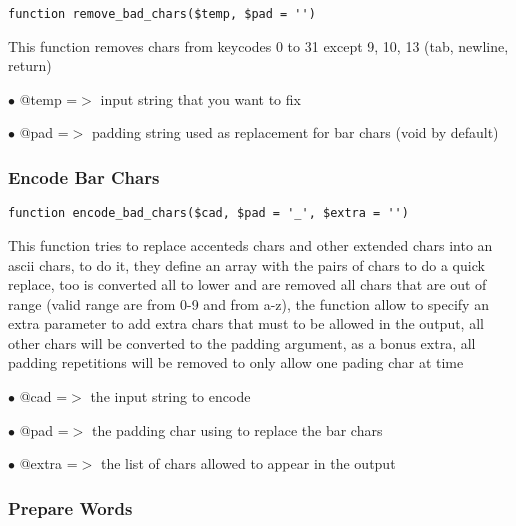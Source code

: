 \documentclass[a4paper]{article}
\begin{document}
\begin{lstlisting}
function remove_bad_chars($temp, $pad = '')
\end{lstlisting}

This function removes chars from keycodes 0 to 31 except 9, 10, 13 (tab,
newline, return)

\begin{compactitem}
\item[\color{myblue}$\bullet$] @temp =$>$ input string that you want to fix
\item[\color{myblue}$\bullet$] @pad  =$>$ padding string used as replacement for bar chars (void by default)
\end{compactitem}

\hypertarget{toc238}{}
\subsubsection{Encode Bar Chars}

\begin{lstlisting}
function encode_bad_chars($cad, $pad = '_', $extra = '')
\end{lstlisting}

This function tries to replace accenteds chars and other extended chars into
an ascii chars, to do it, they define an array with the pairs of chars to
do a quick replace, too is converted all to lower and are removed all chars
that are out of range (valid range are from 0-9 and from a-z), the function
allow to specify an extra parameter to add extra chars that must to be
allowed in the output, all other chars will be converted to the padding
argument, as a bonus extra, all padding repetitions will be removed to
only allow one pading char at time

\begin{compactitem}
\item[\color{myblue}$\bullet$] @cad   =$>$ the input string to encode
\item[\color{myblue}$\bullet$] @pad   =$>$ the padding char using to replace the bar chars
\item[\color{myblue}$\bullet$] @extra =$>$ the list of chars allowed to appear in the output
\end{compactitem}

\hypertarget{toc239}{}
\subsubsection{Prepare Words}
\end{document}

